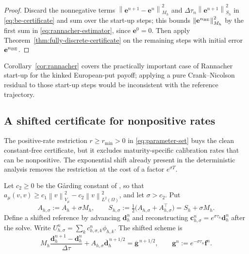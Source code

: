 \documentclass[11pt]{amsart}
\theoremstyle{remark}
\newcommand{\Vmu}{V_{\mu}}
\newcommand{\Mh}{M_h}
\newcommand{\Ah}{A_h}
\newcommand{\Sh}{S_h}
\newcommand{\norm}[1]{\left\lVert #1\right\rVert}
\newcommand{\dt}{\Delta\tau}
\newcommand{\ee}{\mathbf e}
\newcommand{\cc}{\mathbf c}
\newcommand{\ff}{\mathbf f}
\newcommand{\rf}{r}
\begin{document}
\begin{proof}
Discard the nonnegative terms $\norm{\ee^{n+1}-\ee^n}_{\Mh}^2$ and
$\dt_n\norm{\ee^{n+1}}_{\Sh}^2$ in \eqref{eq:be-certificate} and sum over the
start-up steps; this bounds $\norm{\ee^{n_{\rm BE}}}_{\Mh}^2$ by the first sum
in \eqref{eq:rannacher-estimator}, since $\ee^0=0$.  Then apply
Theorem~\ref{thm:fully-discrete-certificate} on the remaining steps with
initial error $\ee^{n_{\rm BE}}$.
\end{proof}

Corollary~\ref{cor:rannacher} covers the practically important case of
Rannacher start-up for the kinked European-put payoff; applying a pure
Crank--Nicolson residual to those start-up steps would be inconsistent with
the reference trajectory.

\subsection{A shifted certificate for nonpositive rates}
\label{ssec:shifted}

The positive-rate restriction $\rf\ge r_{\min}>0$ in \eqref{eq:parameter-set}
buys the clean constant-free certificate, but it excludes maturity-specific
calibration rates that can be nonpositive.  The exponential shift already
present in the deterministic analysis removes the restriction at the cost of a
factor $e^{\sigma T}$.

Let $c_2\ge0$ be the G\aa rding constant of \cite{DamircheliCGMY2026}, so that
$a_\mu(v,v)\ge c_1\norm{v}_{\Vmu}^2-c_2\norm{v}_{L^2(\Omega)}^2$, and let
$\sigma>c_2$.  Put
\begin{equation}
  A_{h,\sigma}:=\Ah+\sigma\Mh,
  \qquad
  S_{h,\sigma}:=\tfrac12\bigl(A_{h,\sigma}+A_{h,\sigma}^\top\bigr)=\Sh+\sigma\Mh .
  \label{eq:shifted-matrices}
\end{equation}
Define a shifted reference by advancing $\mathbf d_h^n$ and reconstructing
$\cc_{h,\sigma}^n=e^{\sigma\tau_n}\mathbf d_h^n$ after the solve.
Write $U_{h,\sigma}^n=\sum_k c_{h,\sigma,k}^n\phi_{h,k}$.
The shifted scheme is
\begin{equation}
  \Mh\frac{\mathbf d_h^{n+1}-\mathbf d_h^{n}}{\dt}
  +A_{h,\sigma}\overline{\mathbf d}_h^{\,n+1/2}
  =\overline{\mathbf g}^{\,n+1/2},
  \qquad
  \mathbf g^n:=e^{-\sigma\tau_n}\ff^n .
  \label{eq:shifted-cn}
\end{equation}
\end{document}
